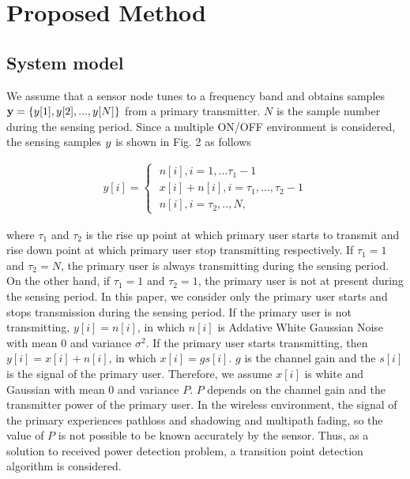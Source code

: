 \chapter[Active Period Detection Method of Primary Signal for Spectrum Database]{Proposed Method}
\label{chapter:Propose}
\section{System model}
\label{system}

We assume that a sensor node tunes to a frequency band and obtains samples ${\bf y}=\left\{y[1],y[2],...,y[N]\right\}$ from a primary transmitter. $N$ is the sample number during the sensing period. Since a multiple ON/OFF environment is considered, the sensing samples ${\boldmath y}$ is shown in Fig. 2 as follows

\begin{align}
y[i] = 
\begin{cases}
\;n[i],    i=1,...\tau_1-1 \\ \nonumber
\;x[i]+n[i], i=\tau_1,...,\tau_2-1 \\
\;n[i],    i=\tau_2,..,N,
\end{cases}
\end{align}

where $\tau_1$ and $\tau_2$ is the rise up point at which primary user starts to transmit and rise down point at which primary user stop transmitting respectively. If $\tau_1=1$ and $\tau_2=N$, the primary user is always transmitting during the sensing period. On the other hand, if $\tau_1=1$ and $\tau_2=1$, the primary user is not at present during the sensing period. In this paper, we consider only the primary user starts and stops transmission during the sensing period.
If the primary user is not transmitting, $y[i] = n[i]$, in which $n[i]$ is Addative White Gaussian Noise with mean 0 and variance $\sigma^2$. If the primary user starts transmitting, then $y[i] = x[i] + n[i]$, in which $x[i] = gs[i]$. $g$ is the channel gain and the $s[i]$ is the signal of the primary user. Therefore, we assume $x[i]$ is white and Gaussian with mean 0 and variance $P$. $P$ depends on the channel gain and the transmitter power of the primary user. In the wireless environment, the signal of the primary experiences pathloss and shadowing and  multipath fading, so the value of $P$ is not possible to be known accurately by the sensor. Thus, as a solution to received power detection problem, a transition point detection algorithm is considered. 

